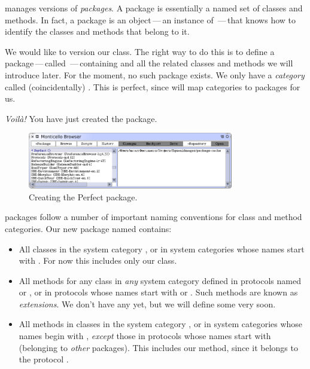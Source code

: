 \documentclass[a4paper,10pt,twoside]{book}
\begin{document}
\MC manages versions of \emph{packages}.  A package is essentially a named set of classes and methods.
In fact, a package is an object\,---\,an instance of \,---\,that knows how to identify the classes and methods that belong to it.

We would like to version our  class. The right way to do this is to define a package\,---\,called \,---\,containing  and all the related classes and methods we will introduce later. For the moment, no such package exists. We only have a \emph{category} called (coincidentally) . This is perfect, since \MC will map categories to packages for us.


\emph{Voil\`a!} You have just created the  \MC package. 

\begin{figure}[ht]\centering
	\includegraphics[width=0.8\textwidth]{perfectPackage}
	\caption{Creating the Perfect package.}
\end{figure}

\MC packages follow a number of important naming conventions for class and method categories.
Our new package named  contains:

\begin{itemize}

\item All classes in the system category , or in system categories whose names start with . For now this includes only our  class. 

\item All methods for any class in \emph{any} system category defined in protocols named  or , or in protocols whose names start with  or . Such methods are known as \emph{extensions}. We don't have any yet, but we will define some very soon.

\item All methods in classes in the system category , or in system categories whose names begin with , \emph{except} those in protocols whose names start with \prot{*} (\ie belonging to \emph{other} packages). This includes our  method, since it belongs to the protocol .

\end{itemize}
\end{document}
